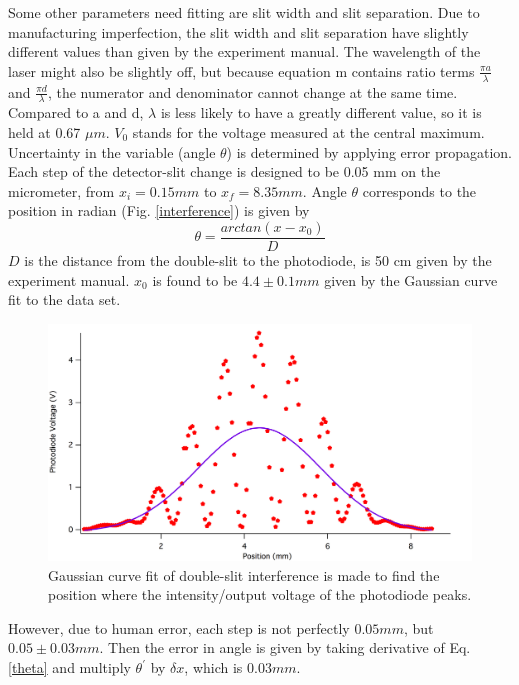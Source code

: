 \documentclass[prb,preprint]{revtex4-1}
\begin{document}
Some other parameters need fitting are slit width and slit separation. Due to manufacturing imperfection, the slit width and slit separation have slightly different values than given by the experiment manual. The wavelength of the laser might also be slightly off, but because equation m contains ratio terms $\frac{\pi a}{\lambda}$ and $\frac{\pi d}{\lambda}$, the numerator and denominator cannot change at the same time. Compared to a and d, $\lambda$ is less likely to have a greatly different value, so it is held at 0.67 $\mu m$. $V_{0}$ stands for the voltage measured at the central maximum.\\

Uncertainty in the variable (angle $\theta$) is determined by applying error propagation. Each step of the detector-slit change is designed to be 0.05 mm on the micrometer, from $x_i = 0.15 mm$ to $x_f = 8.35 mm$. Angle $\theta$ corresponds to the position in radian (Fig. \ref{interference}) is given by
\begin{equation}
\theta = \frac{arctan(x-x_0)}{D}
\label{theta}
\end{equation}
$D$ is the distance from the double-slit to the photodiode, is 50 cm given by the experiment manual.
$x_0$ is found to be $4.4 \pm 0.1mm$ given by the Gaussian curve fit to the data set.

\begin{figure}[h]
\centering
\includegraphics[width=7in]{doublegaus.pdf}
\caption{Gaussian curve fit of double-slit interference is made to find the position where the intensity/output voltage of the photodiode peaks.}
\label{gasfit}
\end{figure}

However, due to human error, each step is not perfectly $0.05 mm$, but $0.05\pm0.03 mm$.
Then the error in angle is given by taking derivative of Eq. \ref{theta} and multiply $\theta^\prime$ by $\delta x$, which is $0.03 mm$. 
\end{document}

